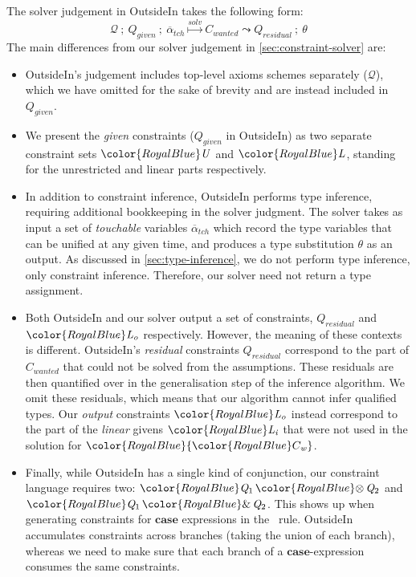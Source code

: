 \documentclass[acmsmall,usenames,dvipsnames,natbib=false,acmthm=false,screen]{acmart}
\newcommand{\constraintcolour}{\color{RoyalBlue}}
\newcommand{\constraintfont}[1]{{\constraintcolour#1}}
\newcommand{\constraintop}[1]{\mathop{\constraintfont{#1}}}
\newcommand{\aand}{\constraintop{\&}}
\newcommand{\qtensor}{\constraintop{\otimes}}
\newcommand{\keyword}[1]{\mathbf{#1}}
\newcommand{\kcase}{\keyword{case}}
\theoremstyle{acmplain}
\theoremstyle{acmdefinition}
\begin{document}
The solver judgement in OutsideIn takes the following form:
%
\[\mathcal{Q}\ ;\ Q_{\mathit{given}}\ ;\ \overline{\alpha}_{\mathit{tch}} \overset{\mathit{solv}}{\mapsto} C_{\mathit{wanted}} \leadsto Q_{\mathit{residual}}\  ; \ \theta\]
%
The main differences from our solver judgement in \cref{sec:constraint-solver} are:
\begin{itemize}
  \item OutsideIn's judgement includes top-level axioms schemes separately
($\mathcal{Q}$), which we have omitted for the sake of brevity and are instead
included in $Q_{\mathit{given}}$.
  \item We present the \emph{given} constraints ($Q_{\mathit{given}}$ in OutsideIn) as two separate
constraint sets $  \constraintfont{ \ottnt{U} }  $ and $  \constraintfont{ \ottnt{L} }  $, standing for the unrestricted and linear
parts respectively.
  \item In addition to constraint inference, OutsideIn performs type
inference, requiring additional bookkeeping in the solver judgment. The solver
takes as input a set of \emph{touchable} variables $\overline{\alpha}_{tch}$
which record the type variables that can be unified at any given time, and
produces a type substitution $\theta$ as an output.
As discussed in \cref{sec:type-inference}, we do not perform type
inference, only constraint inference. Therefore, our solver need not return a
type assignment.
  \item Both
OutsideIn and our solver output a set of constraints, $Q_{\mathit{residual}}$ and
$  \constraintfont{ \ottnt{L}_{\ottmv{o}} }  $ respectively. However, the meaning of these contexts is different.
OutsideIn's \emph{residual} constraints $Q_{\mathit{residual}}$
correspond to the part of $C_{\mathit{wanted}}$ that could not be solved from the
assumptions. These residuals are then quantified over in the generalisation step
of the inference algorithm. We omit these residuals, which means that our
algorithm cannot infer qualified types.
Our \emph{output} constraints $  \constraintfont{ \ottnt{L}_{\ottmv{o}} }  $ instead correspond to the part of the
\emph{linear} givens $  \constraintfont{ \ottnt{L}_{\ottmv{i}} }  $ that were not used in the solution for $  \constraintfont{ \constraintfont{C_{\ottmv{w}}} }  $.

\item Finally, while OutsideIn has a single kind of conjunction, our constraint
language requires two: $  \constraintfont{ \ottnt{Q_{{\mathrm{1}}}}  \qtensor  \ottnt{Q_{{\mathrm{2}}}} }  $ and $  \constraintfont{ \ottnt{Q_{{\mathrm{1}}}}  \aand  \ottnt{Q_{{\mathrm{2}}}} }  $. This shows up when
generating constraints for $\kcase$ expressions in the~ rule.
OutsideIn accumulates constraints across branches (taking the union of each
branch), whereas we need to make sure that each branch of a $\kcase$-expression
consumes the same constraints.
\end{itemize}
\end{document}

